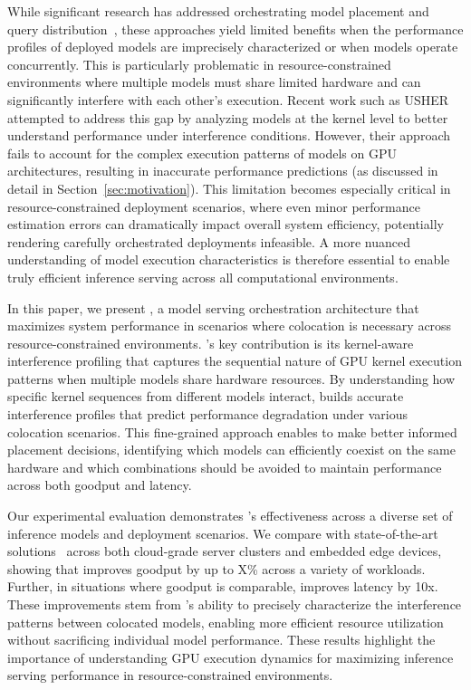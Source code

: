 While significant research has addressed orchestrating model placement and query
distribution~\cite{}, these approaches yield limited benefits when the
performance profiles of deployed models are imprecisely characterized or when
models operate concurrently. This is particularly problematic in
resource-constrained environments where multiple models must share limited
hardware and can significantly interfere with each other's execution. Recent
work such as USHER~\cite{shubha2024usher} attempted to address this gap by
analyzing models at the kernel level to better understand performance under
interference conditions. However, their approach fails to account for the
complex execution patterns of models on GPU architectures, resulting in
inaccurate performance predictions (as discussed in detail in
Section~\ref{sec:motivation}). This limitation becomes especially critical in
resource-constrained deployment scenarios, where even minor performance
estimation errors can dramatically impact overall system efficiency, potentially
rendering carefully orchestrated deployments infeasible. A more nuanced
understanding of model execution characteristics is therefore essential to
enable truly efficient inference serving across all computational environments.

In this paper, we present \roomie, a model serving orchestration architecture
that maximizes system performance in scenarios where colocation is necessary
across resource-constrained environments. \roomie's key contribution is its
kernel-aware interference profiling that captures the sequential nature of GPU
kernel execution patterns when multiple models share hardware resources. By
understanding how specific kernel sequences from different models interact,
\roomie{} builds accurate interference profiles that predict performance
degradation under various colocation scenarios. This fine-grained approach
enables \roomie{} to make better informed placement decisions, identifying
which models can efficiently coexist on the same hardware and which combinations
should be avoided to maintain performance across both goodput and latency.

Our experimental evaluation demonstrates \roomie's effectiveness across a
diverse set of inference models and deployment scenarios. We compare \roomie{}
with state-of-the-art solutions~\cite{} across both cloud-grade server clusters
and embedded edge devices, showing that \roomie{} improves goodput by up to X\%
across a variety of workloads. Further, in situations where goodput is
comparable, \roomie{} improves latency by 10x. These improvements stem from
\roomie's ability to precisely characterize the interference patterns between
colocated models, enabling more efficient resource utilization without
sacrificing individual model performance. These results highlight the importance
of understanding GPU execution dynamics for maximizing inference serving
performance in resource-constrained environments.
